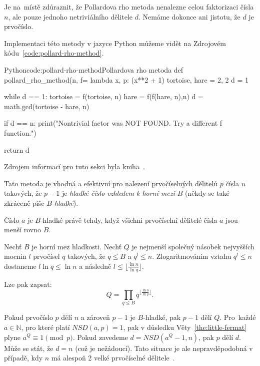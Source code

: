 \documentclass[
  program=infoi,
  biblatex=false,
  figures=true,
  glossaries,
  tables=false,
  sourcecodes=true,
  index
]{kidiplom}
\begin{document}
            Je na~místě zdůraznit, že Pollardova rho metoda nenalezne celou faktorizaci čísla $n$, ale pouze
            jednoho netriviálního dělitele $d$.
            Nemáme dokonce ani jistotu, že $d$ je prvočíslo.
            
            Implementaci této metody v jazyce Python můžeme vidět na Zdrojovém kódu~\ref{code:pollard-rho-method}.
            
\begin{kicode}{Python}{code:pollard-rho-method}{Pollardova rho metoda}
def pollard_rho_method(n, f= lambda x, p: (x**2 + 1) %
    tortoise, hare = 2, 2
    d = 1

    while d == 1:
        tortoise = f(tortoise, n)
        hare = f(f(hare, n),n)
        d = math.gcd(tortoise - hare, n)

    if d == n:
        print("Nontrivial factor was NOT FOUND. Try a different f function.")

    return d
\end{kicode}


        \label{sss:pollard-p-1-method}

            Zdrojem informací pro tuto sekci byla kniha~\cite{handbook}.

            Tato metoda je vhodná a efektivní pro nalezení prvočíselných dělitelů $p$ čísla $n$ takových, že $p-1$ je \emph{hladké
            číslo vzhledem k horní mezi $B$}
            (někdy se také zkráceně píše \emph{$B$-hladké}).

            \begin{definition}
                Číslo $a$ je $B$-hladké právě tehdy, když všichni prvočíselní dělitelé čísla $a$ jsou menší rovno $B$.
            \end{definition}

            Nechť $B$ je horní mez hladkosti.
            Nechť $Q$ je nejmenší společný násobek nejvyšších mocnin $l$ prvočísel $q$ takových, že $q \leq B$ a $q^l \leq n$.
            Zlogaritmováním vztahu $q^l \leq n$ dostaneme $l \ln{q} \leq \ln{n}$ a
            následně $l \leq \lfloor \frac{\ln{n}}{\ln{q}} \rfloor $.

            Lze pak zapsat:
            \[
                Q = \prod_{q \leq B} q^{\lfloor \frac{\ln{n}}{\ln{q}} \rfloor}.
            \]

            Pokud prvočíslo $p$ dělí $n$ a zároveň $p-1$ je $B$-hladké, pak $p-1$ dělí $Q$.
            Pro~každé $a \in \mathbb{N}$, pro které platí $NSD(a,p) = 1$, pak v důsledku Věty~\ref{the:little-fermat} plyne
            $a^Q \equiv 1 \pmod{p}$. Pokud zavedeme $d = NSD(a^Q - 1, n)$, pak $p$ dělí $d$.
            Může se stát, že $d = n$ (což je nežádoucí).
            Tato situace je ale nepravděpodobná v případě, kdy $n$ má alespoň 2 velké prvočíselné dělitele~\cite{handbook}.
\end{document}
